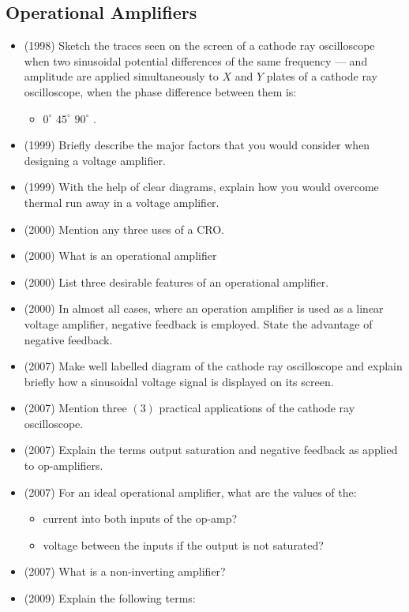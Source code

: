 \documentclass{article}
\begin{document}
\subsection{Operational Amplifiers}
\begin{itemize}
\item (1998)  Sketch the traces seen on the screen of a cathode ray oscilloscope when two sinusoidal potential differences of the same frequency — and amplitude are applied simultaneously to $ X$ and $ Y$ plates of  a cathode ray oscilloscope, when the phase difference between them is:\begin{itemize}
\item $ 0^{\circ}$ $ 45^{\circ}$ $ 90^{\circ}$ .
\end{itemize}
\item (1999)  Briefly describe the major factors that you would consider when designing a voltage amplifier.
\item (1999)  With the help of clear diagrams, explain how you would overcome thermal run away in a voltage amplifier.
\item (2000)  Mention any three uses of a CRO.
\item (2000)  What is an operational amplifier 
\item (2000)  List three desirable features of an operational amplifier.
\item (2000)  In almost all cases, where an operation amplifier is used as a linear voltage amplifier, negative feedback is employed. State the advantage of negative feedback.
\item (2007)  Make well labelled diagram of the cathode ray oscilloscope and explain briefly how a sinusoidal voltage signal is displayed on its screen.
\item (2007)  Mention three $ (3)$ practical applications of the cathode ray oscilloscope.
\item (2007)  Explain the terms output saturation and negative feedback as applied to op-amplifiers. 
\item (2007)  For an ideal operational amplifier, what are the values of the:\begin{itemize}
\item current into both inputs of the op-amp? 
\item voltage between the inputs if the output is not saturated? 
\end{itemize}
\item (2007)  What is a non-inverting amplifier? 
\item (2009)  Explain the following terms:\begin{itemize}

\end{itemize}
\end{itemize}
\end{document}

